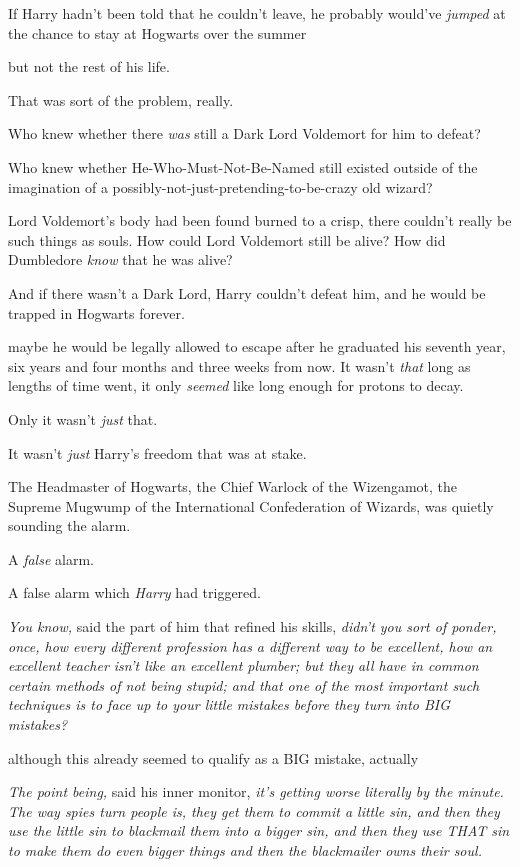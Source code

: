 If Harry hadn't been told that he couldn't leave, he probably would've
\emph{jumped} at the chance to stay at Hogwarts over the summer{\el}

{\el} but not the rest of his life.

That was sort of the problem, really.

Who knew whether there \emph{was} still a Dark Lord Voldemort for him to defeat?

Who knew whether He-Who-Must-Not-Be-Named still existed outside of the
imagination of a possibly-not-just-pretending-to-be-crazy old wizard?

Lord Voldemort's body had been found burned to a crisp, there couldn't really
be such things as souls. How could Lord Voldemort still be alive? How did
Dumbledore \emph{know} that he was alive?

And if there wasn't a Dark Lord, Harry couldn't defeat him, and he would be
trapped in Hogwarts forever.

{\el} maybe he would be legally allowed to escape after he graduated his
seventh year, six years and four months and three weeks from now. It wasn't
\emph{that} long as lengths of time went, it only \emph{seemed} like long
enough for protons to decay.

Only it wasn't \emph{just} that.

It wasn't \emph{just} Harry's freedom that was at stake.

The Headmaster of Hogwarts, the Chief Warlock of the Wizengamot, the Supreme
Mugwump of the International Confederation of Wizards, was quietly sounding the
alarm.

A \emph{false} alarm.

A false alarm which \emph{Harry} had triggered.

\emph{You know,} said the part of him that refined his skills, \emph{didn't you
sort of ponder, once, how every different profession has a different way to be
excellent, how an excellent teacher isn't like an excellent plumber; but they
all have in common certain methods of not being stupid; and that one of the
most important such techniques is to face up to your little mistakes before
they turn into BIG mistakes?}

{\el} although this already seemed to qualify as a BIG mistake,
actually{\el}

\emph{The point being,} said his inner monitor, \emph{it's getting worse
literally by the minute. The way spies turn people is, they get them to commit
a little sin, and then they use the little sin to blackmail them into a bigger
sin, and then they use THAT sin to make them do even bigger things and then the
blackmailer owns their soul.}

